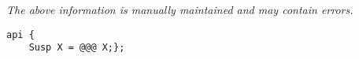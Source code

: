 \label{pkg:suspension}

{\tiny \it The above information is manually maintained and may contain errors.}
\begin{verbatim}
api {
    Susp X = @@@ X;};
\end{verbatim}
